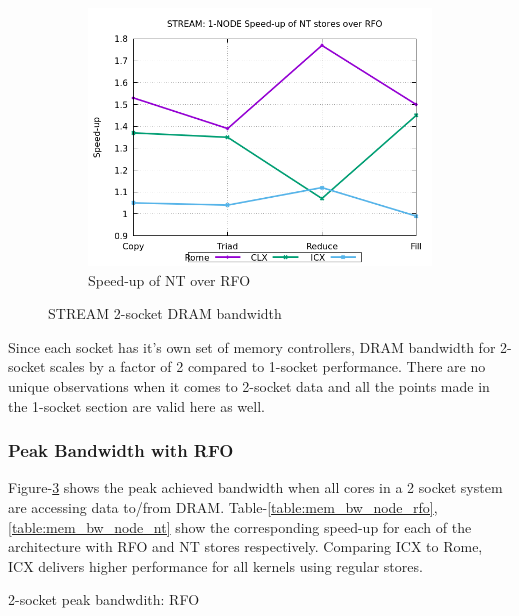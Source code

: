 \documentclass{article}
\begin{document}
\begin{figure}[!ht]
\begin{subfigure}[!hb]{0.3\textwidth}
         \label{figure:mem_bw_node_nt}
    \end{subfigure}
    \begin{subfigure}[!hb]{0.3\textwidth}
         \centering
         \includegraphics[width=\textwidth]{../mem_bw_node/mb_node_nt_rfo}
         \caption{Speed-up of NT over RFO}
         \label{figure:mem_bw_node_nt_rfo}
    \end{subfigure}

    \caption{STREAM 2-socket DRAM bandwidth}
    \label{figure:mem_bw_node}
\end{figure}


Since each socket has it's own set of memory controllers, DRAM bandwidth for 2-socket scales by a factor of 2 compared to 1-socket performance. There are no unique observations when it comes to 2-socket data and all the points made in the 1-socket section are valid here as well.
\subsubsection{Peak Bandwidth with RFO}
Figure-\ref{figure:mem_bw_node} shows the peak achieved bandwidth when all cores in a 2 socket system are accessing data to/from DRAM. Table-\ref{table:mem_bw_node_rfo}, \ref{table:mem_bw_node_nt} show the corresponding speed-up for each of the architecture with RFO and NT stores respectively. Comparing ICX to Rome, ICX delivers higher performance for all kernels using regular stores.

\begin{table}[h!]
\centering

\caption{2-socket peak bandwdith: RFO}
\label{table:mem_bw_node_rfo}
\end{table}
\end{document}
